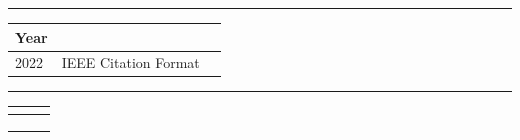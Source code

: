 \documentclass[10pt, a4paper]{article} %
\newcommand{\sectiontitle}[1]{%
    \vspace{0.5cm}%
    \noindent\textbf{\Large #1}%
    \vspace{0.2cm}%
    \hrule %
    \vspace{0.2cm}%
}
\newcommand{\tableheader}[1]{%
    \textbf{#1}%
}
\begin{document}
\sectiontitle{\PublicationsPatentsTitle}
\begin{tabularx}{\textwidth}{| l | X | c |} 
    \hline
    \tableheader{Year}  & \tableheader{\DetailTitle} \\
    \hline
     2022  & IEEE  Citation Format\\
    \hline
\end{tabularx}

\sectiontitle{\SkillTitle}
\begin{tabularx}{\textwidth}{| l | X | X |} %
    \hline
    \tableheader{\SkillTypeTitle} & \tableheader{\SkillNameTitle} & \tableheader{\SkillRemarkTitle} \\
    \hline
     &  &  \\    
    \hline
     &  &  \\
    &  &  \\
    \hline
\end{tabularx}

\end{document}
